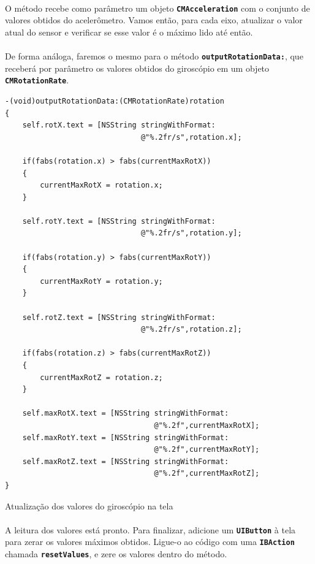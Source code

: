 \documentclass[a4paper,12pt,brazil,doubleside]{book}
\begin{document}
\begin{singlespace}
\paragraph{}O método recebe como parâmetro um objeto \texttt{\textbf{CMAcceleration}} com o conjunto de valores obtidos do acelerômetro. Vamos então, para cada eixo, atualizar o valor atual do sensor e verificar se esse valor é o máximo lido até então.
\paragraph{}De forma análoga, faremos o mesmo para o método \texttt{\textbf{outputRotationData:}}, que receberá por parâmetro os valores obtidos do giroscópio em um objeto \texttt{\textbf{CMRotationRate}}.

\begin{listing}[H]
\begin{verbatim}
-(void)outputRotationData:(CMRotationRate)rotation
{
    self.rotX.text = [NSString stringWithFormat:
                               @"%.2fr/s",rotation.x];
    
    if(fabs(rotation.x) > fabs(currentMaxRotX))
    {
        currentMaxRotX = rotation.x;
    }
    
    self.rotY.text = [NSString stringWithFormat:
                               @"%.2fr/s",rotation.y];
    
    if(fabs(rotation.y) > fabs(currentMaxRotY))
    {
        currentMaxRotY = rotation.y;
    }
    
    self.rotZ.text = [NSString stringWithFormat:
                               @"%.2fr/s",rotation.z];
    
    if(fabs(rotation.z) > fabs(currentMaxRotZ))
    {
        currentMaxRotZ = rotation.z;
    }
    
    self.maxRotX.text = [NSString stringWithFormat:
                                  @"%.2f",currentMaxRotX];
    self.maxRotY.text = [NSString stringWithFormat:
                                  @"%.2f",currentMaxRotY];
    self.maxRotZ.text = [NSString stringWithFormat:
                                  @"%.2f",currentMaxRotZ];
}
\end{verbatim}
\caption{Atualização dos valores do giroscópio na tela}
\end{listing}

\paragraph{}A leitura dos valores está pronto. Para finalizar, adicione um \texttt{\textbf{UIButton}} à tela para zerar os valores máximos obtidos. Ligue-o ao código com uma \texttt{\textbf{IBAction}} chamada \texttt{\textbf{resetValues}}, e zere os valores dentro do método.


\end{singlespace}
\end{document}
